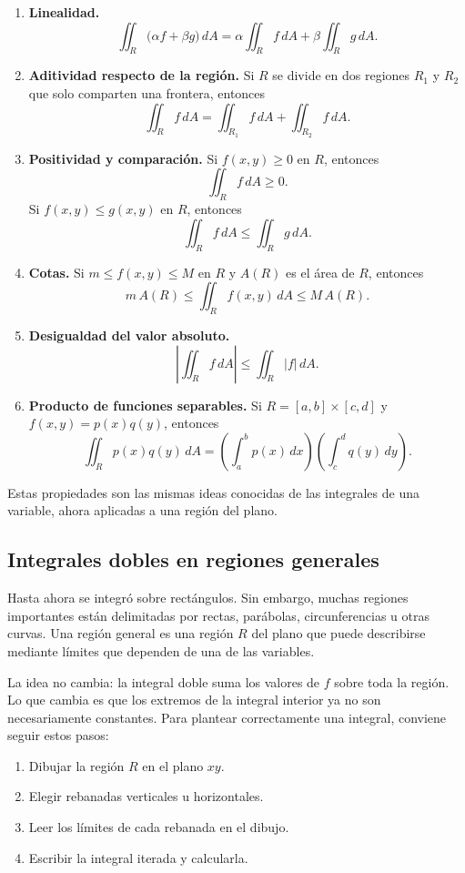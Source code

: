 \begin{enumerate}
    \item \textbf{Linealidad.}
    \[
    \iint_R\bigl(\alpha f+\beta g\bigr)\,dA
    =\alpha\iint_R f\,dA+\beta\iint_R g\,dA.
    \]

    \item \textbf{Aditividad respecto de la región.} Si $R$ se divide en dos regiones $R_1$ y $R_2$ que solo comparten una frontera, entonces
    \[
    \iint_R f\,dA
    =\iint_{R_1}f\,dA+\iint_{R_2}f\,dA.
    \]

    \item \textbf{Positividad y comparación.} Si $f(x,y)\geq 0$ en $R$, entonces
    \[
    \iint_R f\,dA\geq 0.
    \]
    Si $f(x,y)\leq g(x,y)$ en $R$, entonces
    \[
    \iint_R f\,dA\leq\iint_R g\,dA.
    \]

    \item \textbf{Cotas.} Si $m\leq f(x,y)\leq M$ en $R$ y $A(R)$ es el área de $R$, entonces
    \[
    m\,A(R)\leq\iint_R f(x,y)\,dA\leq M\,A(R).
    \]

    \item \textbf{Desigualdad del valor absoluto.}
    \[
    \left|\iint_R f\,dA\right|
    \leq\iint_R|f|\,dA.
    \]

    \item \textbf{Producto de funciones separables.} Si $R=[a,b]\times[c,d]$ y $f(x,y)=p(x)q(y)$, entonces
    \[
    \iint_R p(x)q(y)\,dA
    =\left(\int_a^b p(x)\,dx\right)
     \left(\int_c^d q(y)\,dy\right).
    \]
\end{enumerate}

Estas propiedades son las mismas ideas conocidas de las integrales de una variable, ahora aplicadas a una región del plano.

\subsection{Integrales dobles en regiones generales}

Hasta ahora se integró sobre rectángulos. Sin embargo, muchas regiones importantes están delimitadas por rectas, parábolas, circunferencias u otras curvas. Una región general es una región $R$ del plano que puede describirse mediante límites que dependen de una de las variables.

La idea no cambia: la integral doble suma los valores de $f$ sobre toda la región. Lo que cambia es que los extremos de la integral interior ya no son necesariamente constantes. Para plantear correctamente una integral, conviene seguir estos pasos:
\begin{enumerate}
    \item Dibujar la región $R$ en el plano $xy$.
    \item Elegir rebanadas verticales u horizontales.
    \item Leer los límites de cada rebanada en el dibujo.
    \item Escribir la integral iterada y calcularla.
\end{enumerate}

